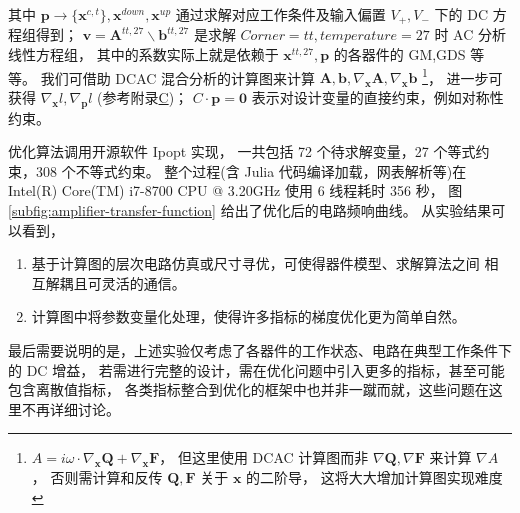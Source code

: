 其中 $\bm{p}\to\{\bm{x}^{c,t}\},\bm{x}^{down},\bm{x}^{up}$
通过求解对应工作条件及输入偏置 $V_+,V_-$ 下的 DC 方程组得到；
$\bm{v}=\bm{A}^{tt,27}\backslash\bm{b}^{tt,27}$ 是求解
$Corner=tt,temperature=27$ 时 AC 分析线性方程组，
其中的系数实际上就是依赖于 $\bm{x}^{tt,27},\bm{p}$ 的各器件的
GM,GDS 等等。
我们可借助 DCAC 混合分析的计算图来计算
$\bm{A},\bm{b},\nabla_{\bm{x}}\bm{A},\nabla_{\bm{x}}\bm{b}$
\footnote{$A=i\omega\cdot\nabla_{\bm{x}}\bm{Q}+\nabla_{\bm{x}}\bm{F}$，
但这里使用 DCAC 计算图而非 $\nabla\bm{Q},\nabla\bm{F}$ 来计算 $\nabla A$，
否则需计算和反传 $\bm{Q},\bm{F}$ 关于 $\bm{x}$ 的二阶导，
这将大大增加计算图实现难度}，
进一步可获得 $\nabla_{\bm{x}}l,\nabla_{\bm{p}}l$
(参考附录\hyperref[appendix:inv-linear-equation-grad]{C})；
$C\cdot\bm{p}=\bm{0}$ 表示对设计变量的直接约束，例如对称性约束。

优化算法调用开源软件 Ipopt\cite{wachter2006implementation} 实现，
一共包括 72 个待求解变量，27 个等式约束，308 个不等式约束。
整个过程(含 Julia 代码编译加载，网表解析等)在
Intel(R) Core(TM) i7-8700 CPU @ 3.20GHz 使用 6 线程耗时 356 秒，
图\ref{subfig:amplifier-transfer-function} 给出了优化后的电路频响曲线。
从实验结果可以看到，
\begin{enumerate}[partopsep=0pt,topsep=0pt,itemsep=0pt,parsep=0pt]
  \item 基于计算图的层次电路仿真或尺寸寻优，可使得器件模型、求解算法之间
    相互解耦且可灵活的通信。
  \item 计算图中将参数变量化处理，使得许多指标的梯度优化更为简单自然。
\end{enumerate}
最后需要说明的是，上述实验仅考虑了各器件的工作状态、电路在典型工作条件下的 DC 增益，
若需进行完整的设计，需在优化问题中引入更多的指标，甚至可能包含离散值指标，
各类指标整合到优化的框架中也并非一蹴而就，这些问题在这里不再详细讨论。
